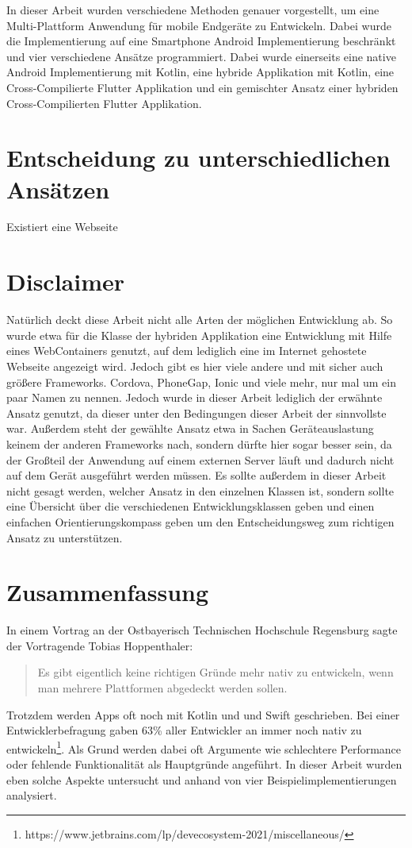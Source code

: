 In dieser Arbeit wurden verschiedene Methoden genauer vorgestellt, um eine Multi-Plattform Anwendung für mobile Endgeräte zu Entwickeln. Dabei wurde die Implementierung auf eine Smartphone Android Implementierung beschränkt und vier verschiedene Ansätze programmiert. Dabei wurde einerseits eine native Android Implementierung mit Kotlin, eine hybride Applikation mit Kotlin, eine Cross-Compilierte Flutter Applikation und ein gemischter Ansatz einer hybriden Cross-Compilierten Flutter Applikation.

\section{Entscheidung zu unterschiedlichen Ansätzen}
Existiert eine Webseite

\section{Disclaimer}
Natürlich deckt diese Arbeit nicht alle Arten der möglichen Entwicklung ab. So wurde etwa für die Klasse der hybriden Applikation eine Entwicklung mit Hilfe eines WebContainers genutzt, auf dem lediglich eine im Internet gehostete Webseite angezeigt wird. Jedoch gibt es hier viele andere und mit sicher auch größere Frameworks. Cordova, PhoneGap, Ionic und viele mehr, nur mal um ein paar Namen zu nennen. Jedoch wurde in dieser Arbeit lediglich der erwähnte Ansatz genutzt, da dieser unter den Bedingungen dieser Arbeit der sinnvollste war. Außerdem steht der gewählte Ansatz etwa in Sachen Geräteauslastung keinem der anderen Frameworks nach, sondern dürfte hier sogar besser sein, da der Großteil der Anwendung auf einem externen Server läuft und dadurch nicht auf dem Gerät ausgeführt werden müssen. Es sollte außerdem in dieser Arbeit nicht gesagt werden, welcher Ansatz in den einzelnen Klassen ist, sondern sollte eine Übersicht über die verschiedenen Entwicklungsklassen geben und einen einfachen Orientierungskompass geben um den Entscheidungsweg zum richtigen Ansatz zu unterstützen.

\section{Zusammenfassung}
In einem Vortrag an der Ostbayerisch Technischen Hochschule Regensburg sagte der Vortragende Tobias Hoppenthaler:
\begin{quote}
Es gibt eigentlich keine richtigen Gründe mehr nativ zu entwickeln, wenn man mehrere Plattformen abgedeckt werden sollen.
\end{quote}
Trotzdem werden Apps oft noch mit Kotlin und und Swift geschrieben. Bei einer Entwicklerbefragung gaben 63\% aller Entwickler an immer noch nativ zu entwickeln\footnote{https://www.jetbrains.com/lp/devecosystem-2021/miscellaneous/}. Als Grund werden dabei oft Argumente wie schlechtere Performance oder fehlende Funktionalität als Hauptgründe angeführt. In dieser Arbeit wurden eben solche Aspekte untersucht und anhand von vier Beispielimplementierungen analysiert. 

